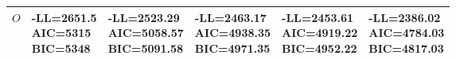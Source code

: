 \begin{tabular}{llllll}
$O$ & \makecell{-LL=2651.5\\AIC=5315\\BIC=5348} & \makecell{-LL=2523.29\\AIC=5058.57\\BIC=5091.58} & \makecell{-LL=2463.17\\AIC=4938.35\\BIC=4971.35} & \makecell{-LL=2453.61\\AIC=4919.22\\BIC=4952.22} & \makecell{-LL=2386.02\\AIC=4784.03\\BIC=4817.03} \\ 
\hline 
\end{tabular}